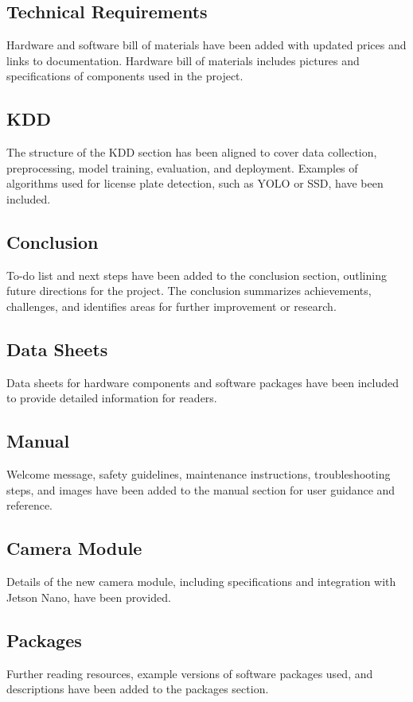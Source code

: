 \subsection*{Technical Requirements}
Hardware and software bill of materials have been added with updated prices and links to documentation. Hardware bill of materials includes pictures and specifications of components used in the project.

\subsection*{KDD}
The structure of the KDD section has been aligned to cover data collection, preprocessing, model training, evaluation, and deployment. Examples of algorithms used for license plate detection, such as YOLO or SSD, have been included.

\subsection*{Conclusion}
To-do list and next steps have been added to the conclusion section, outlining future directions for the project. The conclusion summarizes achievements, challenges, and identifies areas for further improvement or research.

\subsection*{Data Sheets}
Data sheets for hardware components and software packages have been included to provide detailed information for readers.

\subsection*{Manual}
Welcome message, safety guidelines, maintenance instructions, troubleshooting steps, and images have been added to the manual section for user guidance and reference.

\subsection*{Camera Module}
Details of the new camera module, including specifications and integration with Jetson Nano, have been provided.

\subsection*{Packages}
Further reading resources, example versions of software packages used, and descriptions have been added to the packages section.

